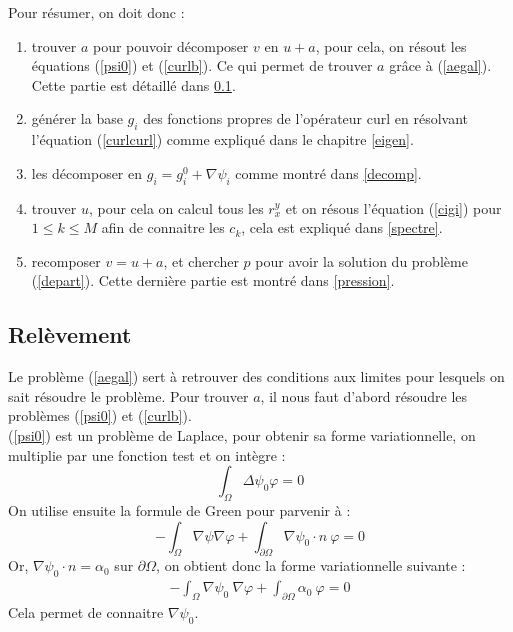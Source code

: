 Pour résumer, on doit donc :
\begin{enumerate}
\item trouver $a$ pour pouvoir décomposer $v$ en $u+a$, pour cela, on résout les équations (\ref{psi0}) et (\ref{curlb}). Ce qui permet de trouver $a$ grâce à (\ref{aegal}). Cette partie est détaillé dans \ref{relev}.
\item générer la base $g_i$ des fonctions propres de l'opérateur curl en résolvant l'équation (\ref{curlcurl}) comme expliqué dans le chapitre \ref{eigen}.
\item les décomposer en $g_i=g_i^0+\nabla\psi_i$ comme montré dans \ref{decomp}.
\item trouver $u$, pour cela on calcul tous les $r_x^y$ et on résous l'équation (\ref{cigi}) pour $1\leq k\leq M$ afin de connaitre les $c_k$, cela est expliqué dans \ref{spectre}.
\item recomposer $v=u+a$, et chercher $p$ pour avoir la solution du problème (\ref{depart}). Cette dernière partie est montré dans \ref{pression}.
\end{enumerate}

\subsection{Relèvement}
\label{relev}

Le problème (\ref{aegal}) sert à retrouver des conditions aux limites pour lesquels on sait résoudre le problème. Pour trouver $a$, il nous faut d'abord résoudre les problèmes (\ref{psi0}) et (\ref{curlb}).\\

(\ref{psi0}) est un problème de Laplace, pour obtenir sa forme variationnelle, on multiplie par une fonction test et on intègre :
\[
\int_\Omega \Delta\psi_0 \varphi = 0
\]
On utilise ensuite la formule de Green pour parvenir à :
\[
-\int_\Omega \nabla\psi\nabla\varphi + \int_{\partial\Omega} \nabla\psi_0\cdot n\ \varphi = 0
\]
Or, $\nabla\psi_0\cdot n = \alpha_0$ sur $\partial\Omega$, on obtient donc la forme variationnelle suivante :
\begin{eqnarray}
\label{fvpsi}
-\int_\Omega \nabla\psi_0\ \nabla\varphi + \int_{\partial\Omega} \alpha_0\ \varphi = 0
\end{eqnarray}
Cela permet de connaitre $\nabla\psi_0$.\\

